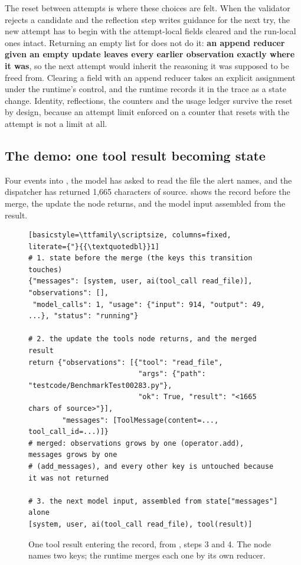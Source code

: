 \ei

The reset between attempts is where these choices are felt. When the validator rejects a candidate
and the reflection step writes guidance for the next try, the new attempt has to begin with the
attempt-local fields cleared and the run-local ones intact. Returning an empty list for
 does not do it: \textbf{an append reducer given an empty update leaves every
earlier observation exactly where it was}, so the next attempt would inherit the reasoning it was
supposed to be freed from. Clearing a field with an append reducer takes an explicit assignment
under the runtime's control, and the runtime records it in the trace as a state change. Identity,
reflections, the counters and the usage ledger survive the reset by design, because an attempt
limit enforced on a counter that resets with the attempt is not a limit at all.

\subsection{The demo: one tool result becoming state}
\label{sec:state-demo}

Four events into , the model has asked to read the file the alert
names, and the dispatcher has returned 1,665 characters of source.  shows
the record before the merge, the update the  node returns, and the model input
assembled from the result.

\begin{figure}[htbp]
\begin{lstlisting}[basicstyle=\ttfamily\scriptsize, columns=fixed,
literate={"}{{\textquotedbl}}1]
# 1. state before the merge (the keys this transition touches)
{"messages": [system, user, ai(tool_call read_file)], "observations": [],
 "model_calls": 1, "usage": {"input": 914, "output": 49, ...}, "status": "running"}

# 2. the update the tools node returns, and the merged result
return {"observations": [{"tool": "read_file",
                          "args": {"path": "testcode/BenchmarkTest00283.py"},
                          "ok": True, "result": "<1665 chars of source>"}],
        "messages": [ToolMessage(content=..., tool_call_id=...)]}
# merged: observations grows by one (operator.add), messages grows by one
# (add_messages), and every other key is untouched because it was not returned

# 3. the next model input, assembled from state["messages"] alone
[system, user, ai(tool_call read_file), tool(result)]
\end{lstlisting}
  \caption{One tool result entering the record, from , steps 3
  and 4. The node names two keys; the runtime merges each one by its own reducer.}
  \label{fig:state-views}
\end{figure}

